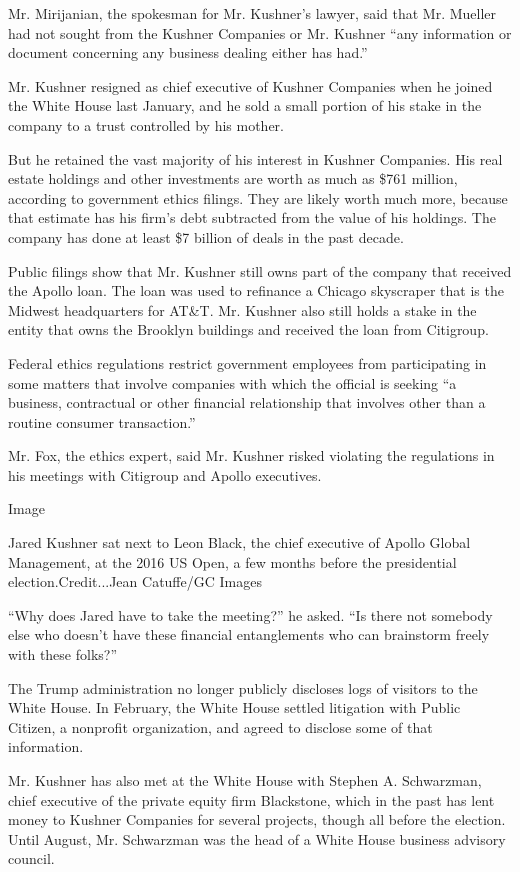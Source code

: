 Mr. Mirijanian, the spokesman for Mr. Kushner's lawyer, said that Mr.
Mueller had not sought from the Kushner Companies or Mr. Kushner ``any
information or document concerning any business dealing either has
had.''

Mr. Kushner resigned as chief executive of Kushner Companies when he
joined the White House last January, and he sold a small portion of his
stake in the company to a trust controlled by his mother.

But he retained the vast majority of his interest in Kushner Companies.
His real estate holdings and other investments are worth as much as
\$761 million, according to government ethics filings. They are likely
worth much more, because that estimate has his firm's debt subtracted
from the value of his holdings. The company has done at least \$7
billion of deals in the past decade.

Public filings show that Mr. Kushner still owns part of the company that
received the Apollo loan. The loan was used to refinance a Chicago
skyscraper that is the Midwest headquarters for AT\&T. Mr. Kushner also
still holds a stake in the entity that owns the Brooklyn buildings and
received the loan from Citigroup.

Federal ethics regulations restrict government employees from
participating in some matters that involve companies with which the
official is seeking ``a business, contractual or other financial
relationship that involves other than a routine consumer transaction.''

Mr. Fox, the ethics expert, said Mr. Kushner risked violating the
regulations in his meetings with Citigroup and Apollo executives.

Image

Jared Kushner sat next to Leon Black, the chief executive of Apollo
Global Management, at the 2016 US Open, a few months before the
presidential election.Credit...Jean Catuffe/GC Images

``Why does Jared have to take the meeting?'' he asked. ``Is there not
somebody else who doesn't have these financial entanglements who can
brainstorm freely with these folks?''

The Trump administration no longer publicly discloses logs of visitors
to the White House. In February, the White House settled litigation with
Public Citizen, a nonprofit organization, and agreed to disclose some of
that information.

Mr. Kushner has also met at the White House with Stephen A. Schwarzman,
chief executive of the private equity firm Blackstone, which in the past
has lent money to Kushner Companies for several projects, though all
before the election. Until August, Mr. Schwarzman was the head of a
White House business advisory council.

